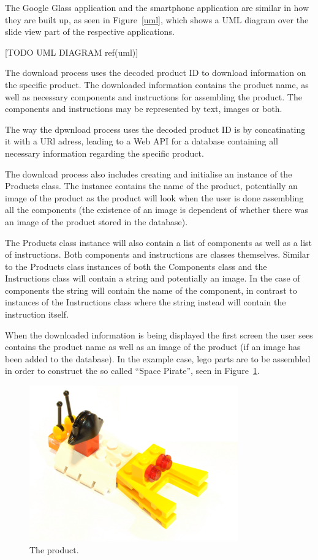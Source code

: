 The Google Glass application and the smartphone application are similar in how they are built up, as seen in Figure~\ref{uml}, which shows a UML diagram over the slide view part of the respective applications.

[TODO UML DIAGRAM ref(uml)]




The download process uses the decoded product ID to download information on the specific product. The downloaded information contains the product name, as well as necessary components and instructions for assembling the product. The components and instructions may be represented by text, images or both. 

The way the dpwnload process uses the decoded product ID is by concatinating it with a URl adress, leading to a Web API for a database containing all necessary information regarding the specific product.

The download process also includes creating and initialise an instance of the Products class. The instance contains the name of the product, potentially an image of the product as the product will look when the user is done assembling all the components (the existence of an image is dependent of whether there was an image of the product stored in the database).

The Products class instance will also contain a list of components as well as a list of instructions. Both components and instructions are classes themselves. Similar to the Products class instances of both the Components class and the Instructions class will contain a string and potentially an image. In the case of components the string will contain the name of the component, in contrast to instances of the Instructions class where the string instead will contain the instruction itself.

When the downloaded information is being displayed the first screen the user sees contains the product name as well as an image of the product (if an image has been added to the database). In the example case, lego parts are to be assembled in order to construct the so called ``Space Pirate'', seen in Figure~\ref{glassDemoRaw}.

	\begin{figure}[ht!]
		\centering
		\includegraphics[width=90mm]{images/rawImages/BILD_6}
		\caption{The product.}
		\label{glassDemoRaw}
	\end{figure}

